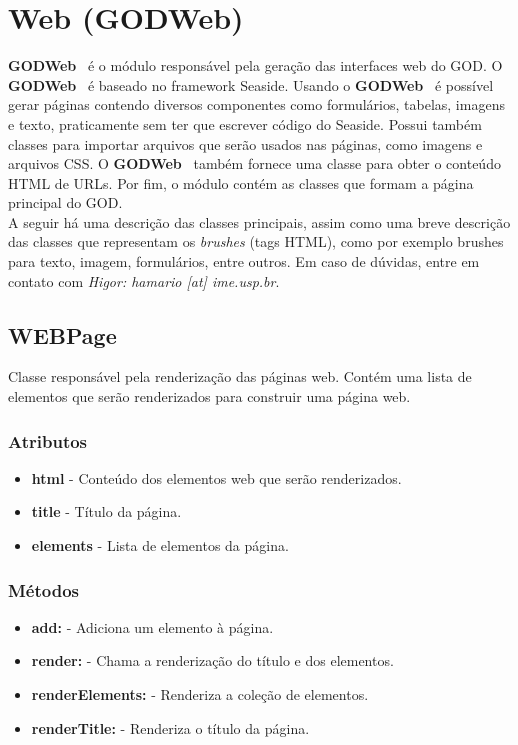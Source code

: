 \def\godweb{\textbf{GODWeb}}
\def\goddata{\textbf{GODData}}

\section{Web (\godweb)}

\godweb~ é o módulo responsável pela geração das interfaces web do GOD. O \godweb~ é baseado no framework Seaside.
Usando o \godweb~ é possível gerar páginas contendo diversos componentes como formulários, tabelas, imagens e texto, praticamente sem ter que escrever código do Seaside.
Possui também classes para importar arquivos que serão usados nas páginas, como imagens e arquivos CSS. O \godweb~ também fornece uma classe para obter o conteúdo HTML de URLs. 
Por fim, o módulo contém as classes que formam a página principal do GOD.\\

A seguir há uma descrição das classes principais, assim como uma breve descrição das classes que representam os \textit{brushes} (tags HTML), como por exemplo brushes para texto, imagem, formulários, entre outros.
Em caso de dúvidas, entre em contato com \emph{Higor: hamario [at] ime.usp.br}.


\subsection{WEBPage} 

Classe responsável pela renderização das páginas web. Contém uma lista de elementos que serão renderizados para construir uma página web.

\subsubsection{Atributos}

\begin{itemize}
 \item \textbf{html} - Conteúdo dos elementos web que serão renderizados.
 \item \textbf{title} - Título da página.
 \item \textbf{elements} - Lista de elementos da página.
\end{itemize}

\subsubsection{Métodos}

\begin{itemize}
 \item \textbf{add:} - Adiciona um elemento à página.
 \item \textbf{render:} - Chama a renderização do título e dos elementos.
 \item \textbf{renderElements:} - Renderiza a coleção de elementos.
 \item \textbf{renderTitle:} - Renderiza o título da página.
\end{itemize}

